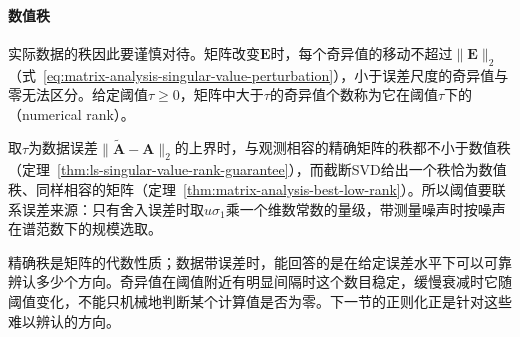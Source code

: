 \paragraph{数值秩}
实际数据的秩因此要谨慎对待。矩阵改变$\bm E$时，每个奇异值的移动不超过$\lVert\bm E\rVert_2$（式~\eqref{eq:matrix-analysis-singular-value-perturbation}），小于误差尺度的奇异值与零无法区分。给定阈值$\tau\geq0$，矩阵中大于$\tau$的奇异值个数称为它在阈值$\tau$下的（numerical rank）。

取$\tau$为数据误差$\lVert\tilde{\bm A}-\bm A\rVert_2$的上界时，与观测相容的精确矩阵的秩都不小于数值秩（定理~\ref{thm:ls-singular-value-rank-guarantee}），而截断SVD给出一个秩恰为数值秩、同样相容的矩阵（定理~\ref{thm:matrix-analysis-best-low-rank}）。所以阈值要联系误差来源：只有舍入误差时取$u\sigma_1$乘一个维数常数的量级，带测量噪声时按噪声在谱范数下的规模选取。

精确秩是矩阵的代数性质；数据带误差时，能回答的是在给定误差水平下可以可靠辨认多少个方向。奇异值在阈值附近有明显间隔时这个数目稳定，缓慢衰减时它随阈值变化，不能只机械地判断某个计算值是否为零。下一节的正则化正是针对这些难以辨认的方向。
